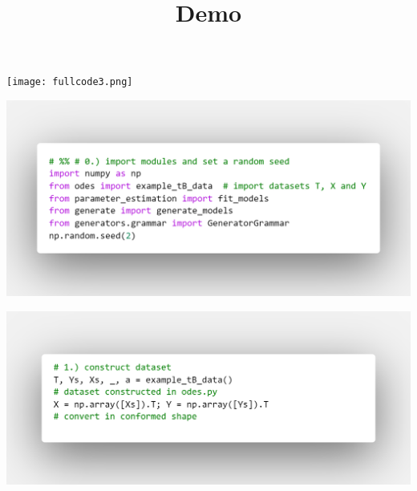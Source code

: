 \documentclass[t,usenames,dvipsnames]{beamer} %
\title{Demo}
\begin{document}
\begin{frame}
  \maketitle
\end{frame}


\begin{frame}[plain]
	\begin{center}
\texttt{[image: fullcode3.png]}
	\end{center}
\end{frame}
\restoregeometry

\begin{frame}
	\begin{center}
\includegraphics[width=\paperwidth]
{code-shots/0imports.png}				
	\end{center}
\end{frame}

\begin{frame}
	\includegraphics[width=\paperwidth]
{code-shots/1dataset-construction.png}
\end{frame}
\restoregeometry
\end{document}

